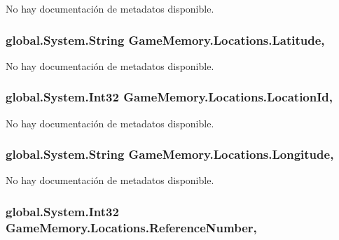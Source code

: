 No hay documentación de metadatos disponible. 

\hypertarget{class_game_memory_1_1_locations_a9bfc421c1b405e1abc46caa06a9f32df}{
\subsubsection[{Latitude}]{\setlength{\rightskip}{0pt plus 5cm}global.\-System.\-String Game\-Memory.\-Locations.\-Latitude\hspace{0.3cm}{\ttfamily [get]}, {\ttfamily [set]}}}\label{class_game_memory_1_1_locations_a9bfc421c1b405e1abc46caa06a9f32df}


No hay documentación de metadatos disponible. 

\hypertarget{class_game_memory_1_1_locations_a701a32d74857333fff435f05e2ce9f6a}{
\subsubsection[{Location\-Id}]{\setlength{\rightskip}{0pt plus 5cm}global.\-System.\-Int32 Game\-Memory.\-Locations.\-Location\-Id\hspace{0.3cm}{\ttfamily [get]}, {\ttfamily [set]}}}\label{class_game_memory_1_1_locations_a701a32d74857333fff435f05e2ce9f6a}


No hay documentación de metadatos disponible. 

\hypertarget{class_game_memory_1_1_locations_a1e157ff8446d76da3fff6479e73d910c}{
\subsubsection[{Longitude}]{\setlength{\rightskip}{0pt plus 5cm}global.\-System.\-String Game\-Memory.\-Locations.\-Longitude\hspace{0.3cm}{\ttfamily [get]}, {\ttfamily [set]}}}\label{class_game_memory_1_1_locations_a1e157ff8446d76da3fff6479e73d910c}


No hay documentación de metadatos disponible. 

\hypertarget{class_game_memory_1_1_locations_ab0156c8a60262ce8d1665214335fd7aa}{
\subsubsection[{Reference\-Number}]{\setlength{\rightskip}{0pt plus 5cm}global.\-System.\-Int32 Game\-Memory.\-Locations.\-Reference\-Number\hspace{0.3cm}{\ttfamily [get]}, {\ttfamily [set]}}}\label{class_game_memory_1_1_locations_ab0156c8a60262ce8d1665214335fd7aa}


